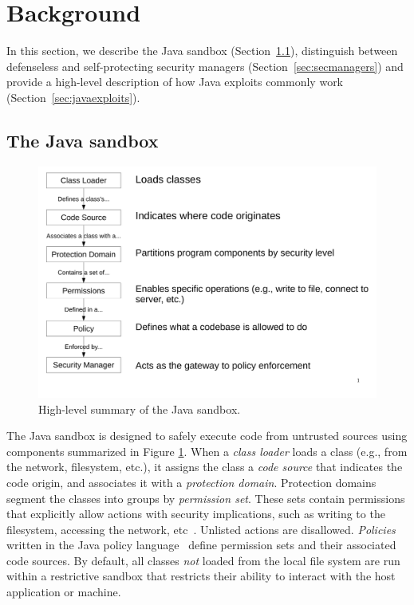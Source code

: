 \documentclass{sig-alternate}
\begin{document}
\section{Background}\label{sec:Background}

In this section, we describe the Java sandbox
(Section~\ref{sec:sandbox}), distinguish between defenseless and self-protecting
security managers (Section~\ref{sec:secmanagers}) and provide a high-level
description of how Java exploits commonly work
(Section~\ref{sec:javaexploits}). 

\subsection{The Java sandbox}
\label{sec:sandbox}

\begin{figure}
\includegraphics[width=\columnwidth]{sandbox_overview}
\caption{High-level summary of the Java 
\label{fig:Sandbox-high-level-summary}
sandbox.}
\end{figure}

The Java sandbox is designed to safely execute code from untrusted
sources using components summarized in Figure
\ref{fig:Sandbox-high-level-summary}. 
When a \textit{class loader} loads a class (e.g., from
the network, filesystem, etc.), it assigns the class a \textit{code source} that
indicates the code origin, and associates it with a \textit{protection
  domain}. Protection domains segment the classes into groups by
\textit{permission set}. These sets
contain permissions that explicitly allow actions with security
implications, such as writing to the filesystem, accessing the network, etc~\cite{_permissions_2014}.  Unlisted actions are disallowed.
\emph{Policies} written in the Java policy
language~\cite{_java_policy_language} define permission sets and their associated code
sources. 
By default, all classes \emph{not} loaded from the local file system are run
within a restrictive sandbox that restricts their ability to
interact with the host application or machine. 
\end{document}

